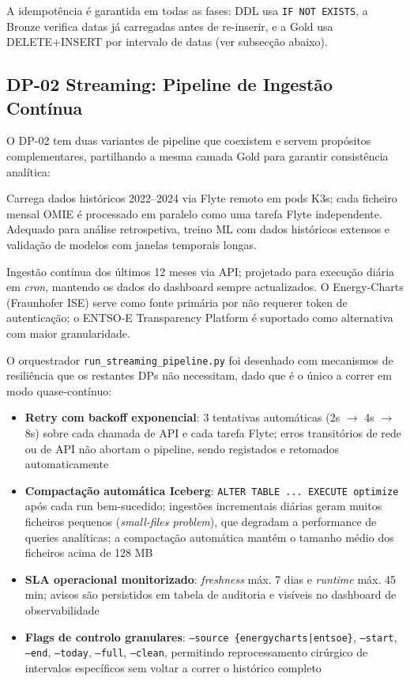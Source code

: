 \documentclass[11pt,a4paper]{article}
\begin{document}
A idempotência é garantida em todas as fases: DDL usa \texttt{IF NOT EXISTS}, a Bronze verifica datas já carregadas antes de re-inserir, e a Gold usa DELETE+INSERT por intervalo de datas (ver subsecção abaixo).

\subsection{DP-02 Streaming: Pipeline de Ingestão Contínua}

O DP-02 tem duas variantes de pipeline que coexistem e servem propósitos complementares, partilhando a mesma camada Gold para garantir consistência analítica:

\begin{description}[style=nextline,leftmargin=0pt,labelwidth=0pt]
  \item[\textbf{Static (OMIE CSV)}] Carrega dados históricos 2022--2024 via Flyte remoto em pods K3s; cada ficheiro mensal OMIE é processado em paralelo como uma tarefa Flyte independente. Adequado para análise retrospetiva, treino ML com dados históricos extensos e validação de modelos com janelas temporais longas.
  \item[\textbf{Streaming (ENTSO-E / Energy-Charts API)}] Ingestão contínua dos últimos 12 meses via API; projetado para execução diária em \textit{cron}, mantendo os dados do dashboard sempre actualizados. O Energy-Charts (Fraunhofer ISE) serve como fonte primária por não requerer token de autenticação; o ENTSO-E Transparency Platform é suportado como alternativa com maior granularidade.
\end{description}

O orquestrador \texttt{run\_streaming\_pipeline.py} foi desenhado com mecanismos de resiliência que os restantes DPs não necessitam, dado que é o único a correr em modo quase-contínuo:

\begin{itemize}[leftmargin=*,noitemsep]
  \item \textbf{Retry com backoff exponencial}: 3 tentativas automáticas (2s $\rightarrow$ 4s $\rightarrow$ 8s) sobre cada chamada de API e cada tarefa Flyte; erros transitórios de rede ou de API não abortam o pipeline, sendo registados e retomados automaticamente
  \item \textbf{Compactação automática Iceberg}: \texttt{ALTER TABLE ... EXECUTE optimize} após cada run bem-sucedido; ingestões incrementais diárias geram muitos ficheiros pequenos (\textit{small-files problem}), que degradam a performance de queries analíticas; a compactação automática mantém o tamanho médio dos ficheiros acima de 128 MB
  \item \textbf{SLA operacional monitorizado}: \textit{freshness} máx. 7 dias e \textit{runtime} máx. 45 min; avisos são persistidos em tabela de auditoria e visíveis no dashboard de observabilidade
  \item \textbf{Flags de controlo granulares}: \texttt{--source \{energycharts|entsoe\}}, \texttt{--start}, \texttt{--end}, \texttt{--today}, \texttt{--full}, \texttt{--clean}, permitindo reprocessamento cirúrgico de intervalos específicos sem voltar a correr o histórico completo
\end{itemize}
\end{document}
